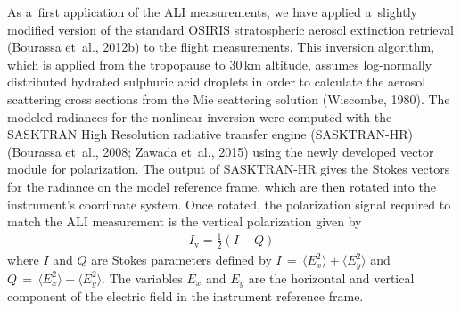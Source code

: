\documentclass[amtd, online, hvmath]{copernicus}
\begin{document}
As a~first application of the ALI measurements, we have applied
a~slightly modified version of the standard OSIRIS stratospheric
aerosol extinction retrieval (Bourassa et~al., 2012b) to the flight
measurements. This inversion algorithm, which is applied from the
tropopause to 30\,\unit{km} altitude, assumes log-normally distributed
hydrated sulphuric acid droplets in order to calculate the aerosol
scattering cross sections from the Mie scattering solution (Wiscombe,
1980). The modeled radiances for the nonlinear inversion were computed
with the SASKTRAN High Resolution radiative transfer engine
(SASKTRAN-HR) (Bourassa et~al., 2008; Zawada et~al., 2015) using the
newly developed vector module for polarization. The output of SASKTRAN-HR gives the Stokes vectors for the
radiance on the model reference frame, which are then rotated into the
instrument's coordinate system. Once rotated, the polarization signal
required to match the ALI measurement is the vertical polarization
given by
\begin{align}
I_{\mathrm{v}}=\frac{1}{2}\left(I-Q \right)
\end{align}
where $I$ and $Q$ are Stokes parameters defined by $I\,=\,\langle
E_x^2\rangle + \langle E_y^2\rangle$ and $Q\,=\,\langle E_x^2\rangle -
\langle E_y^2\rangle$. The variables $E_{x}$ and $E_{y}$ are the
horizontal and vertical component of the electric field in the
instrument reference frame.
\end{document}
